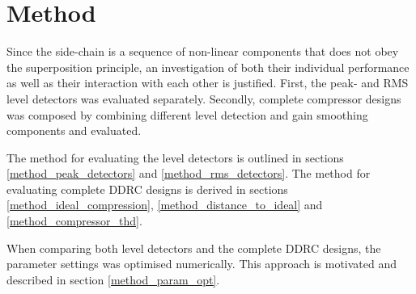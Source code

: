 \documentclass[../main2.tex]{subfiles}
\providecommand{\rootdir}{..}
\begin{document}
\section{Method}\label{method}
Since the side-chain is a sequence of non-linear components that does not obey the superposition principle, an investigation of both their individual performance as well as their interaction with each other is justified. First, the peak- and RMS level detectors was evaluated separately. Secondly, complete compressor designs was composed by combining different level detection and gain smoothing components and evaluated.

The method for evaluating the level detectors is outlined in sections \ref{method_peak_detectors} and \ref{method_rms_detectors}. The method for evaluating complete DDRC designs is derived in sections \ref{method_ideal_compression}, \ref{method_distance_to_ideal} and \ref{method_compressor_thd}.

When comparing both level detectors and the complete DDRC designs, the parameter settings was optimised numerically. This approach is motivated and described in section \ref{method_param_opt}.









\end{document}
